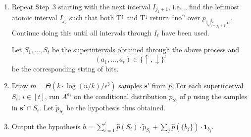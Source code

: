 \documentclass[10pt]{article}
\theoremstyle{definition}
\providecommand{\ie}{i.e.\ }
\numberwithin{equation}{section}
\newcommand{\algorithml}[1]{{\normalfont\texttt{#1}}}
\newcommand{\bm}{\mathbf} %
\newcommand{\eps}{\epsilon}
\newcommand{\wh}[1]{{\widehat{#1}}}
\newcommand{\TND}{{\mathrm{T^{\uparrow}}}}
\newcommand{\TNI}{{\mathrm{T^{\downarrow}}}}
\begin{document}
\begin{algorithm}
\begin{enumerate}
    \emph{Case 1:} If $\widehat{p}[a_{j_1},b_{j_1}]
    \geq 2 \eps/(10k)$, define $I'_{j_1}: = [a_{j_1},b_{j_1}-1]$ and
$b_{j_1}$ is a \emph{heavy} point.

   \emph{Case 2:}  If $\widehat{p}[a_{j_1},b_{j_1}] < 2 \eps/(10k)$ then define $I'_{j_1}:=I_{j_1}$.

   Call $I'_{j_1}$ a \emph{negligible} interval.
  If $j_1 >1$ then define the first \emph{superinterval} $S_1$ to be $\bigcup_{i=1}^{j_1-1} I_i$, and
   set $a_1 \in \{\uparrow,\downarrow\}$ to be $a_1=\uparrow$ if $\TND$
   returned ``yes'' on $p_{\bigcup_{i=1}^{j_1-1} I_i}$ and to be $a_1=\downarrow$ if $\TNI$
   returned ``yes'' on $p_{\bigcup_{i=1}^{j_1-1} I_i}$.


\item Repeat Step~3 starting with the next interval $I_{j_1+1}$,
\ie, find the leftmost atomic interval $I_{j_2}$ such that
both $\TND$ and $\TNI$ return ``no'' over
$p_{\bigcup_{i=j_1+1}^{j_2} I_i}$.
  Continue doing this until
   all intervals through $I_{\ell}$ have been used.


   Let $S_1,\dots,S_t$ be the superintervals obtained through the above process and
  \[
(a_1,\dots,a_t) \in \{\uparrow,\downarrow\}^t
\]
be the corresponding string of bits.


\item Draw $m = \Theta(k \cdot \log (n/k) / \eps^3)$ samples $\mathbf{s}' $ from $p$.
For each superinterval $S_i$, $i\in[t]$, run $A^{a_i}$ on the conditional distribution $p_{S_i}$ of $p$ using the samples in $\mathbf{s}' \cap S_i$.
Let $\widetilde{p}_{S_i}$ be the hypothesis thus obtained.


\item Output the hypothesis $h  =  \sum_{i=1}^t \wh{p}(S_i) \cdot \widetilde{p}_{S_i} +
\sum_j \wh{p} (\{b_j\}) \cdot {\bm 1}_{b_j}$.

\end{enumerate}
\caption{\algorithml{Learn-kmodal}}\label{alg:learn-kmodal}
\end{algorithm}
\end{document}
